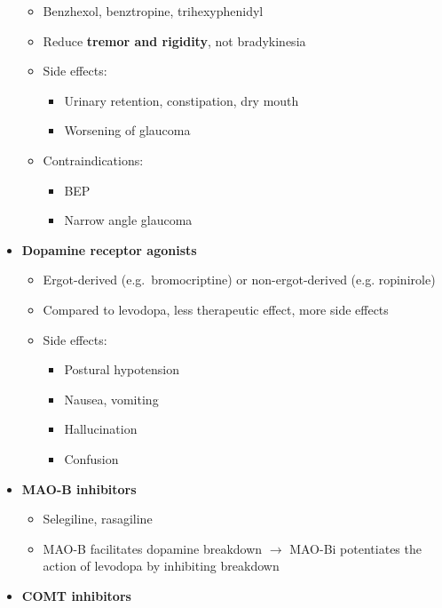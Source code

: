 \documentclass[
  12pt,
]{memoir}
\providecommand{\tightlist}{%
  \setlength{\itemsep}{0pt}\setlength{\parskip}{0pt}}
\begin{document}
\begin{itemize}
  \begin{itemize}
  \tightlist
  \item
    Benzhexol, benztropine, trihexyphenidyl
  \item
    Reduce \textbf{tremor and rigidity}, not bradykinesia
  \item
    Side effects:

    \begin{itemize}
    \tightlist
    \item
      Urinary retention, constipation, dry mouth
    \item
      Worsening of glaucoma
    \end{itemize}
  \item
    Contraindications:

    \begin{itemize}
    \tightlist
    \item
      BEP
    \item
      Narrow angle glaucoma
    \end{itemize}
  \end{itemize}
\item
  \textbf{Dopamine receptor agonists}

  \begin{itemize}
  \tightlist
  \item
    Ergot-derived (e.g.~bromocriptine) or non-ergot-derived (e.g.
    ropinirole)
  \item
    Compared to levodopa, less therapeutic effect, more side effects
  \item
    Side effects:

    \begin{itemize}
    \tightlist
    \item
      Postural hypotension
    \item
      Nausea, vomiting
    \item
      Hallucination
    \item
      Confusion
    \end{itemize}
  \end{itemize}
\item
  \textbf{MAO-B inhibitors}

  \begin{itemize}
  \tightlist
  \item
    Selegiline, rasagiline
  \item
    MAO-B facilitates dopamine breakdown \(\rightarrow\) MAO-Bi
    potentiates the action of levodopa by inhibiting breakdown
  \end{itemize}
\item
  \textbf{COMT inhibitors}


\end{itemize}
\end{document}
